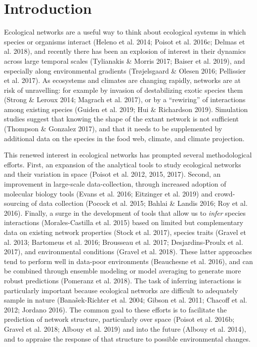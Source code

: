 \hypertarget{introduction}{%
\section{Introduction}\label{introduction}}

Ecological networks are a useful way to think about ecological systems
in which species or organisms interact (Heleno et al. 2014; Poisot et
al. 2016c; Delmas et al. 2018), and recently there has been an explosion
of interest in their dynamics across large temporal scales (Tylianakis
\& Morris 2017; Baiser et al. 2019), and especially along environmental
gradients (Trøjelsgaard \& Olesen 2016; Pellissier et al. 2017). As
ecosystems and climates are changing rapidly, networks are at risk of
unravelling: for example by invasion of destabilizing exotic species
them (Strong \& Leroux 2014; Magrach et al. 2017), or by a ``rewiring''
of interactions among existing species (Guiden et al. 2019; Hui \&
Richardson 2019). Simulation studies suggest that knowing the shape of
the extant network is not sufficient (Thompson \& Gonzalez 2017), and
that it needs to be supplemented by additional data on the species in
the food web, climate, and climate projection.

This renewed interest in ecological networks has prompted several
methodological efforts. First, an expansion of the analytical tools to
study ecological networks and their variation in space (Poisot et al.
2012, 2015, 2017). Second, an improvement in large-scale
data-collection, through increased adoption of molecular biology tools
(Evans et al. 2016; Eitzinger et al. 2019) and crowd-sourcing of data
collection (Pocock et al. 2015; Bahlai \& Landis 2016; Roy et al. 2016).
Finally, a surge in the development of tools that allow us to
\emph{infer} species interactions (Morales-Castilla et al. 2015) based
on limited but complementary data on existing network properties (Stock
et al. 2017), species traits (Gravel et al. 2013; Bartomeus et al. 2016;
Brousseau et al. 2017; Desjardins-Proulx et al. 2017), and environmental
conditions (Gravel et al. 2018). These latter approaches tend to perform
well in data-poor environments (Beauchesne et al. 2016), and can be
combined through ensemble modeling or model averaging to generate more
robust predictions (Pomeranz et al. 2018). The task of inferring
interactions is particularly important because ecological networks are
difficult to adequately sample in nature (Banašek-Richter et al. 2004;
Gibson et al. 2011; Chacoff et al. 2012; Jordano 2016). The common goal
to these efforts is to facilitate the prediction of network structure,
particularly over space (Poisot et al. 2016b; Gravel et al. 2018; Albouy
et al. 2019) and into the future (Albouy et al. 2014), and to appraise
the response of that structure to possible environmental changes.

